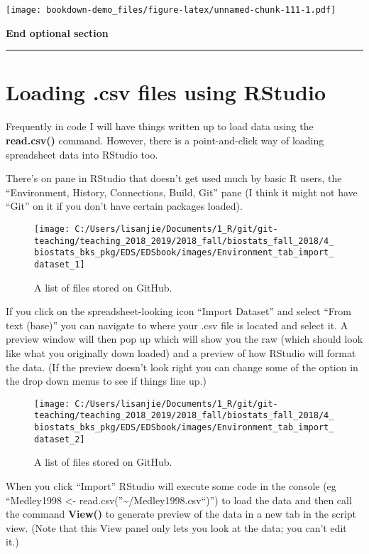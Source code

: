 \documentclass[]{book}
\theoremstyle{definition}
\theoremstyle{definition}
\theoremstyle{definition}
\theoremstyle{remark}
\begin{document}
\texttt{[image: bookdown-demo\_files/figure-latex/unnamed-chunk-111-1.pdf]}

\textbf{End optional section}

\begin{center}\rule{0.5\linewidth}{\linethickness}\end{center}

\section{\texorpdfstring{Loading .csv files using RStudio
\protect\hyperlink{section-3}{}}{Loading .csv files using RStudio }}\label{loading-.csv-files-using-rstudio}

Frequently in code I will have things written up to load data using the
\textbf{read.csv()} command. However, there is a point-and-click way of
loading spreadsheet data into RStudio too.

There's on pane in RStudio that doesn't get used much by basic R users,
the ``Environment, History, Connections, Build, Git'' pane (I think it
might not have ``Git'' on it if you don't have certain packages loaded).

\begin{figure}
\texttt{[image: C:/Users/lisanjie/Documents/1\_R/git/git-teaching/teaching\_2018\_2019/2018\_fall/biostats\_fall\_2018/4\_biostats\_bks\_pkg/EDS/EDSbook/images/Environment\_tab\_import\_dataset\_1]} \caption{A list of files stored on GitHub.}\label{fig:unnamed-chunk-112}
\end{figure}

If you click on the spreadsheet-looking icon ``Import Dataset'' and
select ``From text (base)'' you can navigate to where your .csv file is
located and select it. A preview window will then pop up which will show
you the raw (which should look like what you originally down loaded) and
a preview of how RStudio will format the data. (If the preview doesn't
look right you can change some of the option in the drop down menus to
see if things line up.)

\begin{figure}
\texttt{[image: C:/Users/lisanjie/Documents/1\_R/git/git-teaching/teaching\_2018\_2019/2018\_fall/biostats\_fall\_2018/4\_biostats\_bks\_pkg/EDS/EDSbook/images/Environment\_tab\_import\_dataset\_2]} \caption{A list of files stored on GitHub.}\label{fig:unnamed-chunk-113}
\end{figure}

When you click ``Import'' RStudio will execute some code in the console
(eg ``Medley1998 \textless{}-
read.csv(''\textasciitilde{}/Medley1998.csv``)'') to load the data and
then call the command \textbf{View()} to generate preview of the data in
a new tab in the script view. (Note that this View panel only lets you
look at the data; you can't edit it.)
\end{document}
